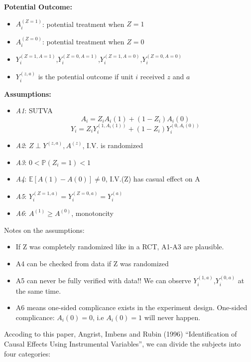 \documentclass[
]{book}
\providecommand{\tightlist}{%
  \setlength{\itemsep}{0pt}\setlength{\parskip}{0pt}}
\begin{document}
\textbf{Potential Outcome:}

\begin{itemize}
\tightlist
\item
  \(A_i^{(Z=1)}\): potential treatment when \(Z=1\)
\item
  \(A_i^{(Z=0)}\): potential treatment when \(Z=0\)
\item
  \(Y_i^{(Z=1, A=1)}\),\(Y_i^{(Z=0, A=1)}\),\(Y_i^{(Z=1, A=0)}\),\(Y_i^{(Z=0, A=0)}\)
\item
  \(Y_i^{(z, a)}\) is the potential outcome if unit \(i\) received \(z\) and \(a\)
\end{itemize}

\textbf{Assumptions:}

\begin{itemize}
\tightlist
\item
  \emph{A1}: SUTVA
  \[A_i = Z_iA_i(1) + (1-Z_i)A_i(0)\]
  \[Y_i = Z_iY_i^{(1, A_i(1))} + (1-Z_i)Y_i^{(0, A_i(0))}\]
\item
  \emph{A2}: \(Z \perp Y^{(z,a)}, A^{(z)}\), I.V. is randomized
\item
  \emph{A3}: \(0 < \mathbb{P}(Z_i = 1) <1\)
\item
  \emph{A4}: \(\mathbb{E}[A(1) - A(0)] \neq 0\), I.V.(Z) has casual effect on A
\item
  \emph{A5}: \(Y_i^{(Z=1, a)}=Y_i^{(Z=0, a)} = Y_i^{(a)}\)
\item
  \emph{A6}: \(A^{(1)} \geq A^{(0)}\), monotoncity
\end{itemize}

Notes on the assumptions:

\begin{itemize}
\tightlist
\item
  If Z was completely randomized like in a RCT, A1-A3 are plausible.
\item
  A4 can be checked from data if Z was randomized
\item
  A5 can never be fully verified with data!! We can observe \(Y_i^{(1,a)}\),\(Y_i^{(0,a)}\) at the same time.
\item
  A6 means one-sided complicance exists in the experiment design. One-sided complicance: \(A_i(0) = 0\), i.e \(A_i(0) = 1\) will never happen.
\end{itemize}

Accoding to this paper, Angrist, Imbens and Rubin (1996) ``Identification of Causal Effects Using Instrumental Variables'', we can divide the subjects into four categories:
\end{document}
